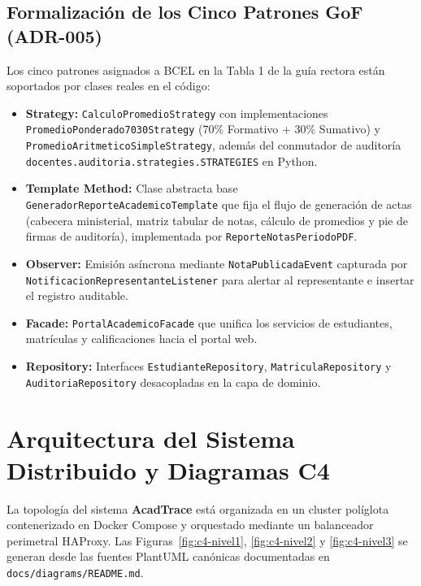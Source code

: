 \documentclass[11pt,a4paper]{article}
\begin{document}
\subsection{Formalizaci\'on de los Cinco Patrones GoF (ADR-005)}
Los cinco patrones asignados a BCEL en la Tabla 1 de la gu\'ia rectora est\'an soportados por clases reales en el c\'odigo:
\begin{itemize}[leftmargin=*]
  \item \textbf{Strategy:} \texttt{CalculoPromedioStrategy} con implementaciones \texttt{PromedioPonderado7030Strategy} (70\% Formativo + 30\% Sumativo) y \texttt{PromedioAritmeticoSimpleStrategy}, adem\'as del conmutador de auditor\'ia \texttt{docentes.auditoria.strategies.STRATEGIES} en Python.
  \item \textbf{Template Method:} Clase abstracta base \texttt{GeneradorReporteAcademicoTemplate} que fija el flujo de generaci\'on de actas (cabecera ministerial, matriz tabular de notas, c\'alculo de promedios y pie de firmas de auditor\'ia), implementada por \texttt{ReporteNotasPeriodoPDF}.
  \item \textbf{Observer:} Emisi\'on as\'incrona mediante \texttt{NotaPublicadaEvent} capturada por \texttt{NotificacionRepresentanteListener} para alertar al representante e insertar el registro auditable.
  \item \textbf{Facade:} \texttt{PortalAcademicoFacade} que unifica los servicios de estudiantes, matr\'iculas y calificaciones hacia el portal web.
  \item \textbf{Repository:} Interfaces \texttt{EstudianteRepository}, \texttt{MatriculaRepository} y \texttt{AuditoriaRepository} desacopladas en la capa de dominio.
\end{itemize}

\newpage

\section{Arquitectura del Sistema Distribuido y Diagramas C4}
\label{sec:arquitectura}
La topolog\'ia del sistema \textbf{AcadTrace} est\'a organizada en un cluster pol\'iglota contenerizado en Docker Compose y orquestado mediante un balanceador perimetral HAProxy. Las Figuras~\ref{fig:c4-nivel1}, \ref{fig:c4-nivel2} y \ref{fig:c4-nivel3} se generan desde las fuentes PlantUML can\'onicas documentadas en \texttt{docs/diagrams/README.md}.
\end{document}
